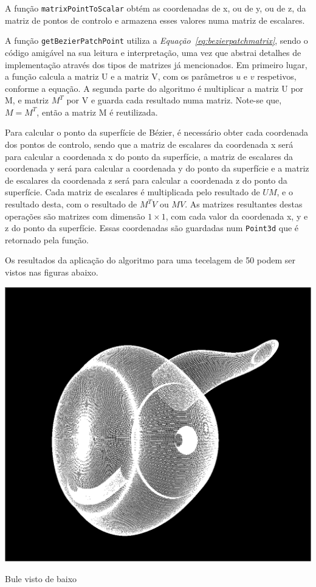 A função \texttt{matrixPointToScalar} obtém as coordenadas de x, ou de y, ou de
z, da matriz de pontos de controlo e armazena esses valores numa matriz de
escalares.


A função \texttt{getBezierPatchPoint} utiliza
a \emph{Equação~\ref{eq:bezierpatchmatrix}}, sendo o código amigável na sua
leitura e interpretação, uma vez que abstrai detalhes de implementação através
dos tipos de matrizes já mencionados. Em primeiro lugar,  a função calcula
a matriz U e a matriz V, com os parâmetros $u$ e $v$ respetivos, conforme
a equação. A segunda parte do algoritmo é multiplicar a matriz U por M, e matriz
$M^T$ por V e guarda cada resultado numa matriz. Note-se que, $M = M^T$, então
a matriz M é reutilizada.

Para calcular o ponto da superfície de Bézier, é necessário obter cada
coordenada dos pontos de controlo, sendo que a matriz de escalares da coordenada
x será para calcular a coordenada x do ponto da superfície, a matriz de
escalares da coordenada y será para calcular a coordenada y do ponto da
superfície e  a matriz de escalares da coordenada z será para calcular
a coordenada z do ponto da superfície. Cada matriz de escalares é multiplicada
pelo resultado de $UM$, e o resultado desta, com o resultado de $M^{T}V$ ou $MV$.
As matrizes resultantes destas operações são matrizes com dimensão $1\times1$,
com cada valor da coordenada x, y e z do ponto da superfície. Essas coordenadas
são guardadas num \texttt{Point3d} que é retornado pela função. 

Os resultados da aplicação do algoritmo para uma tecelagem de 50 podem ser
vistos nas figuras abaixo.

\begin{center}	
 	\includegraphics[width=\textwidth,height=\textheight,keepaspectratio]{resources/teapotBaixo.png}
 	\captionsetup{type=figure, width=0.8\linewidth}
	\caption{Bule visto de baixo}
\label{fig:teapotbottom} 
\end{center}

